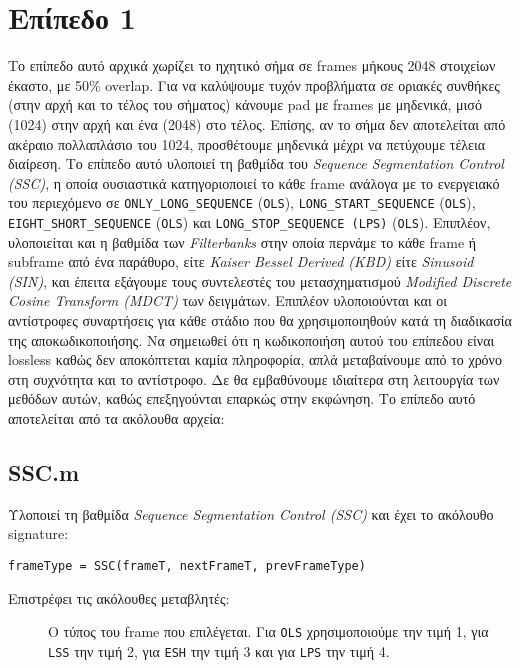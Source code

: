 \section*{Επίπεδο 1}
Το επίπεδο αυτό αρχικά χωρίζει το ηχητικό σήμα σε frames μήκους 2048 στοιχείων
έκαστο, με 50\% overlap. Για να καλύψουμε τυχόν προβλήματα σε οριακές συνθήκες
(στην αρχή και το τέλος του σήματος) κάνουμε pad με frames με μηδενικά, μισό (1024)
στην αρχή και ένα (2048) στο τέλος. Επίσης, αν το σήμα δεν αποτελείται από ακέραιο
πολλαπλάσιο του 1024, προσθέτουμε μηδενικά μέχρι να πετύχουμε τέλεια διαίρεση.
Το επίπεδο αυτό υλοποιεί τη βαθμίδα του \emph{Sequence Segmentation Control
(SSC)}, η οποία ουσιαστικά κατηγοριοποιεί το κάθε frame ανάλογα με το
ενεργειακό του περιεχόμενο σε \verb|ONLY_LONG_SEQUENCE| (\verb|OLS|),
\verb|LONG_START_SEQUENCE| (\verb|OLS|), \verb|EIGHT_SHORT_SEQUENCE|
(\verb|OLS|) και \verb|LONG_STOP_SEQUENCE (LPS)| (\verb|OLS|). Επιπλέον,
υλοποιείται και η βαθμίδα των \emph{Filterbanks} στην οποία περνάμε το κάθε
frame ή subframe από ένα παράθυρο, είτε \emph{Kaiser Bessel Derived (KBD)} είτε
\emph{Sinusoid (SIN)}, και έπειτα εξάγουμε τους συντελεστές του μετασχηματισμού
\emph{Modified Discrete Cosine Transform (MDCT)} των δειγμάτων. Επιπλέον
υλοποιούνται και οι αντίστροφες συναρτήσεις για κάθε στάδιο που θα
χρησιμοποιηθούν κατά τη διαδικασία της αποκωδικοποιήσης. Να σημειωθεί ότι η
κωδικοποιήση αυτού του επίπεδου είναι lossless καθώς δεν αποκόπτεται καμία
πληροφορία, απλά μεταβαίνουμε από το χρόνο στη συχνότητα και το αντίστροφο.
Δε θα εμβαθύνουμε ιδιαίτερα στη λειτουργία των μεθόδων αυτών, καθώς
επεξηγούνται επαρκώς στην εκφώνηση. Το επίπεδο αυτό αποτελείται από τα
ακόλουθα αρχεία:


\subsection*{SSC.m}
Υλοποιεί τη βαθμίδα \emph{Sequence Segmentation Control (SSC)} και έχει το
ακόλουθο signature:
\begin{center}
	\verb|frameType = SSC(frameT, nextFrameT, prevFrameType)|
\end{center}

\noindent Επιστρέφει τις ακόλουθες μεταβλητές:
\begin{description}
\item[] Ο τύπος του frame που επιλέγεται. Για \verb|OLS|
	χρησιμοποιούμε την τιμή 1, για 	\verb|LSS| την τιμή 2, για \verb|ESH| την
	τιμή 3 και για \verb|LPS| την τιμή 4.
\end{description}

